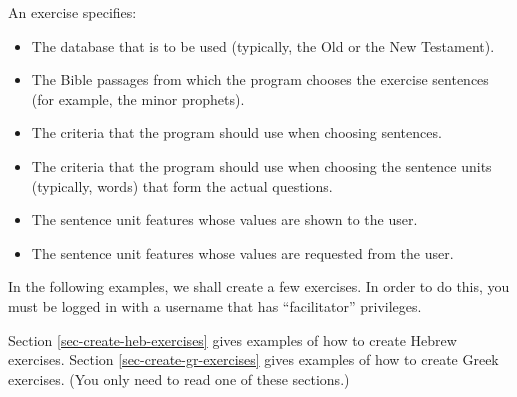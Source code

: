 \documentclass[11pt,oneside,a4paper]{memoir}
\begin{document}
An exercise specifies:

\begin{itemize}
\item The database that is to be used (typically, the Old or the New Testament).
\item The Bible passages from which the program chooses the exercise sentences (for example, the
  minor prophets).
\item The criteria that the program should use when choosing sentences.
\item The criteria that the program should use when choosing the sentence units (typically, words)
  that form the actual questions.
\item The sentence unit features whose values are shown to the user.
\item The sentence unit features whose values are requested from the user.
\end{itemize}

In the following examples, we shall create a few exercises. In order to do this, you must be logged
in with a username that has ``facilitator'' privileges.

Section \ref{sec-create-heb-exercises} gives examples of how to create Hebrew exercises. Section
\ref{sec-create-gr-exercises} gives examples of how to create Greek exercises. (You only need to read one
of these sections.)
\end{document}
